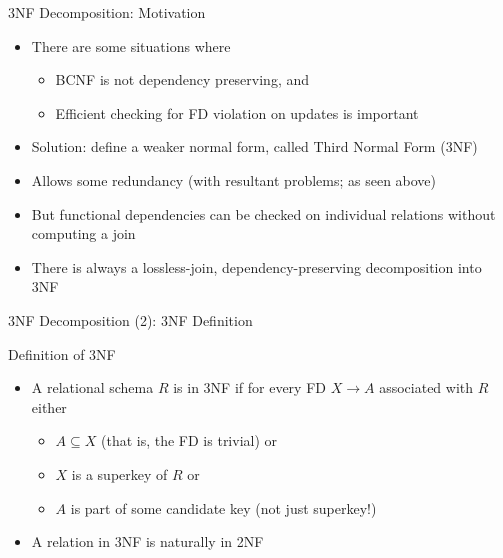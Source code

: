 \documentclass[aspectratio=169, xcolor=dvipsnames]{beamer}
\begin{document}
\begin{frame}{3NF Decomposition: Motivation}
    \begin{itemize}[<+->]
        \item There are some situations where
        \begin{itemize}
            \item[$\triangleright$] BCNF is not dependency preserving, and
            \item[$\triangleright$] Efficient checking for FD violation on updates is important
        \end{itemize}
        \item Solution: define a weaker normal form, called Third Normal Form (3NF)
        \item Allows some redundancy (with resultant problems; as seen above)
        \item But functional dependencies can be checked on individual relations without computing a join
        \item There is always a lossless-join, dependency-preserving decomposition into 3NF
    \end{itemize}
\end{frame}

\begin{frame}{3NF Decomposition (2): 3NF Definition}
    \begin{block}{Definition of 3NF}
        \begin{itemize}[<+->]
            \item A relational schema $R$ is in 3NF if for every FD $X \rightarrow A$ associated with $R$ either
            \begin{itemize}
                \item[$\triangleright$] $A \subseteq X$ (that is, the FD is trivial) or
                \item[$\triangleright$] $X$ is a superkey of $R$ or
                \item[$\triangleright$] $A$ is part of some candidate key (not just superkey!)
            \end{itemize}
            \item A relation in 3NF is naturally in 2NF
        \end{itemize}
    \end{block}
\end{frame}
\end{document}
